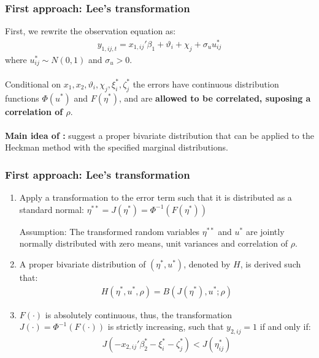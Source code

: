 \begin{frame}
    \frametitle{First approach: Lee's transformation}
    First, we rewrite the observation equation as:
    \begin{align*}
        y_{1,ij,t} = x_{1,ij}'\beta_1 + \vartheta_i + \chi_j + \sigma_u u_{ij}^*
    \end{align*}
\noindent where $u_{i j}^* \sim N(0,1)$ and $\sigma_u > 0$. \pause
\\~\\ 
Conditional on $x_1, x_2, \vartheta_i, \chi_j, \xi_i^*, \zeta_j^*$ the errors have continuous distribution functions $\Phi(u^*)$ and $F(\eta^*)$, and are \textbf{allowed to be correlated, suposing a correlation of $\rho$}. \pause
\\~\\ 
\textbf{Main idea of \cite{lee1983generalized}:} suggest a proper bivariate distribution that can be applied to the Heckman method with the specified marginal distributions.
\end{frame}

\begin{frame}
    \frametitle{First approach: Lee's transformation}
    \begin{enumerate}
        \item Apply a transformation to the error term such that it is distributed as a standard normal: $ \eta^{**} = J(\eta^*) = \Phi^{-1} (F (\eta^*)) $ \pause
        \begin{block}{Assumption:}
            The transformed random variables $\eta^{**}$ and $u^{*}$ are jointly normally distributed with zero means, unit variances and correlation of $\rho$.
        \end{block} \pause

        \item A proper bivariate distribution of $(\eta^*, u^*)$, denoted by $H$, is derived such that:
        \begin{align*}
        H(\eta^*, u^*, \rho) = B ( J(\eta^*), u^*; \rho)
        \end{align*} \pause

        \item $F(\cdot)$ is absolutely continuous, thus, the transformation $J(\cdot) = \Phi^{-1}(F(\cdot))$ is strictly increasing, such that $y_{2,ij}=1$ if and only if: 
        \begin{align*}
            J(-x_{2,ij}'{\beta_2^*}  -\xi_{i}^*-\zeta_{j}^* ) < J(\eta^*_{i j})
        \end{align*}
    \end{enumerate}
\end{frame}

